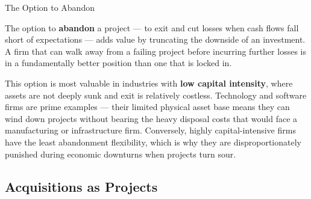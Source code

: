 \documentclass[10pt]{article}
\begin{document}
    \begin{core}{The Option to Abandon}

      The option to \textbf{abandon} a project — to exit and cut losses when cash flows fall short of expectations — adds value by truncating the downside of an investment. A firm that can walk away from a failing project before incurring further losses is in a fundamentally better position than one that is locked in.

      This option is most valuable in industries with \textbf{low capital intensity}, where assets are not deeply sunk and exit is relatively costless. Technology and software firms are prime examples — their limited physical asset base means they can wind down projects without bearing the heavy disposal costs that would face a manufacturing or infrastructure firm. Conversely, highly capital-intensive firms have the least abandonment flexibility, which is why they are disproportionately punished during economic downturns when projects turn sour.


    \end{core}

  \subsection{Acquisitions as Projects}
\end{document}
